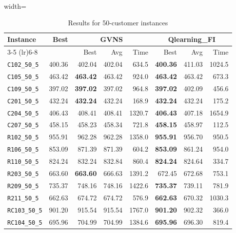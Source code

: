 \begin{table}[ht]
\centering
\small
\setlength{\tabcolsep}{5pt}
\caption{Results for 50-customer instances}
\vspace{4mm}
\begin{adjustbox}{width=\textwidth}
\begin{tabular}{l r r r r @{\hspace{8pt}} r r r @{\hspace{8pt}}}
\toprule
\multirow{2}{*}{Instance} & \multirow{2}{*}{Best} & \multicolumn{3}{c}{GVNS} & \multicolumn{3}{c}{Qlearning\_FI} \\
\cmidrule(lr){3-5} \cmidrule(lr){6-8}
 &  & Best & Avg & Time & Best & Avg & Time \\
\midrule
\texttt{C102\_50\_5} & 400.36 & 402.04 & 402.04 & 634.5 & \textbf{400.36} & 411.03 & 1024.5 \\
\texttt{C105\_50\_5} & 463.42 & \textbf{463.42} & 463.42 & 924.0 & \textbf{463.42} & 463.42 & 673.3 \\
\texttt{C109\_50\_5} & 397.02 & \textbf{397.02} & 397.02 & 964.8 & \textbf{397.02} & 402.09 & 456.6 \\
\texttt{C201\_50\_5} & 432.24 & \textbf{432.24} & 432.24 & 168.9 & \textbf{432.24} & 432.24 & 175.2 \\
\texttt{C204\_50\_5} & 406.43 & 408.41 & 408.41 & 1320.7 & \textbf{406.43} & 407.18 & 1654.9 \\
\texttt{C207\_50\_5} & 458.15 & 458.23 & 458.34 & 721.8 & \textbf{458.15} & 458.97 & 112.5 \\
\texttt{R102\_50\_5} & 955.91 & 962.28 & 962.28 & 1358.0 & \textbf{955.91} & 956.70 & 950.5 \\
\texttt{R106\_50\_5} & 853.09 & 871.39 & 871.39 & 604.2 & \textbf{853.09} & 861.24 & 954.0 \\
\texttt{R110\_50\_5} & 824.24 & 832.24 & 832.84 & 860.4 & \textbf{824.24} & 824.64 & 334.7 \\
\texttt{R203\_50\_5} & 663.60 & \textbf{663.60} & 666.63 & 1391.2 & 672.45 & 672.68 & 753.1 \\
\texttt{R209\_50\_5} & 735.37 & 748.16 & 748.16 & 1422.6 & \textbf{735.37} & 739.11 & 781.9 \\
\texttt{R211\_50\_5} & 662.63 & 674.72 & 674.72 & 576.9 & \textbf{662.63} & 670.32 & 1030.3 \\
\texttt{RC103\_50\_5} & 901.20 & 915.54 & 915.54 & 1767.0 & \textbf{901.20} & 902.32 & 366.0 \\
\texttt{RC104\_50\_5} & 695.96 & 704.99 & 704.99 & 1384.6 & \textbf{695.96} & 696.30 & 819.4 \\

\end{tabular}
\end{adjustbox}
\end{table}
